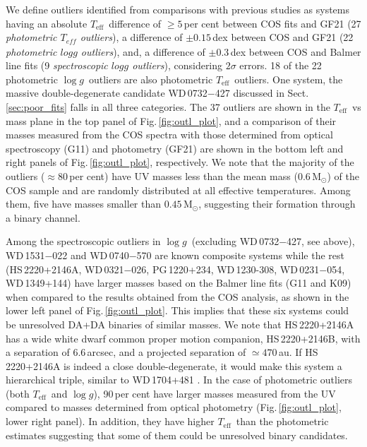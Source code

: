 \documentclass[fleqn,usenatbib, useAMS]{mnras}
\newcommand{\Teff}{\mbox{$T_{\mathrm{eff}}$}}
\newcommand{\logg}{\mbox{$\log g$}}
\newcommand{\Msun}{\mbox{$\mathrm{M_\odot}$}}
\begin{document}
We define outliers identified from comparisons with previous studies as systems having an absolute \Teff\ difference of $\geq5$\,per cent between COS fits and GF21 (27 \textit{photometric $\mathit{T_{eff}}$ outliers}), a difference of $\pm0.15$\,dex between COS and GF21 (22 \textit{photometric $\mathit{log g}$ outliers}), and, a difference of $\pm0.3$\,dex between COS and Balmer line fits (9 \textit{spectroscopic $\mathit{log g}$ outliers}), considering $2\sigma$ errors. 18 of the 22 photometric \logg\ outliers are also photometric \Teff\ outliers. One system, the massive double-degenerate candidate WD\,0732$-$427 discussed in Sect.\,\ref{sec:poor_fits} falls in all three categories. The 37 outliers are shown in the \Teff\ vs mass plane in the top panel of Fig.\,\ref{fig:outl_plot}, and a comparison of their masses measured from the COS spectra with those determined from optical spectroscopy (G11) and photometry (GF21) are shown in the bottom left and right panels of Fig.\,\ref{fig:outl_plot}, respectively. We note that the majority of the outliers ($\approx$80\,per cent) have UV masses less than the mean mass ($0.6\,\Msun$) of the COS sample and are randomly distributed at all effective temperatures. Among them, five have masses smaller than $0.45\,\Msun$, suggesting their formation through a binary channel. 

Among the spectroscopic outliers in \logg\ (excluding WD\,0732$-$427, see above), WD\,1531$-$022 and WD\,0740$-$570 are known composite systems while the rest (HS\,2220+2146A, WD\,0321$-$026, PG\,1220+234, WD\,1230-308, WD\,0231$-$054, WD\,1349+144) have larger masses based on the Balmer line fits (G11 and K09) when compared to the results obtained from the COS analysis, as shown in the lower left panel of Fig.\,\ref{fig:outl_plot}. This implies that these six systems could be unresolved DA+DA binaries of similar masses. We note that HS\,2220+2146A has a wide white dwarf common proper motion companion, HS\,2220+2146B, with a separation of 6.6\,arcsec, and a projected separation of $\simeq470$\,au. If HS\,2220+2146A is indeed a close double-degenerate, it would make this system a hierarchical triple, similar to WD\,1704+481 \citep{2000MNRAS.314..334M}. In the case of photometric outliers (both \Teff\ and \logg), 90\,per cent have larger masses measured from the UV compared to masses determined from optical photometry (Fig.\,\ref{fig:outl_plot}, lower right panel). In addition, they have higher \Teff\ than the photometric estimates suggesting that some of them could be unresolved binary candidates. 
\end{document}
